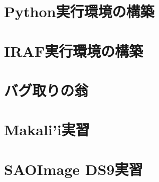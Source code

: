 \section{Python実行環境の構築}

\section{IRAF実行環境の構築}

\section{バグ取りの翁}

\section{Makali'i実習}

\section{SAOImage DS9実習}